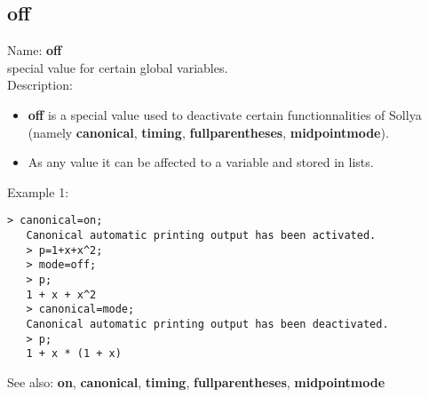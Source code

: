 \subsection{ off }
\noindent Name: \textbf{off}\\
special value for certain global variables.\\

\noindent Description: \begin{itemize}

\item \textbf{off} is a special value used to deactivate certain functionnalities
   of Sollya (namely \textbf{canonical}, \textbf{timing}, \textbf{fullparentheses}, \textbf{midpointmode}).

\item As any value it can be affected to a variable and stored in lists.
\end{itemize}
\noindent Example 1: 
\begin{center}\begin{minipage}{14.8cm}\begin{Verbatim}[frame=single]
   > canonical=on;
   Canonical automatic printing output has been activated.
   > p=1+x+x^2;
   > mode=off;
   > p;
   1 + x + x^2
   > canonical=mode;
   Canonical automatic printing output has been deactivated.
   > p;
   1 + x * (1 + x)
\end{Verbatim}
\end{minipage}\end{center}
See also: \textbf{on}, \textbf{canonical}, \textbf{timing}, \textbf{fullparentheses}, \textbf{midpointmode}
